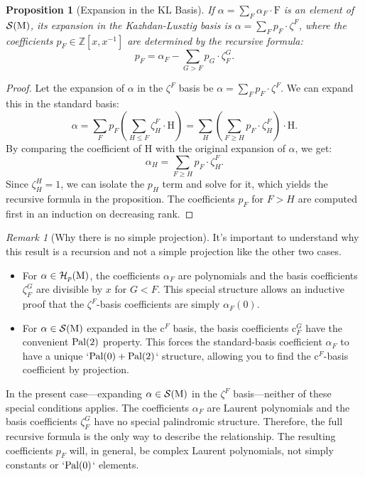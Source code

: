 \documentclass[11pt]{article}
\newcommand{\calH}{\mathcal{H}}
\newcommand{\calS}{\mathcal{S}}
\newcommand{\M}{\normalfont\text{M}}
\newcommand{\ZZ}{\mathbb{Z}}
\newcommand{\Ebasis}[1]{\mathrm{#1}}
\newcommand{\Cbasis}[1]{\mathrm{c}^{#1}}
\newcommand{\CbasisSub}[2]{\mathrm{c}^{#1}_{#2}}
\newcommand{\Zbasis}[1]{\zeta^{#1}}
\newcommand{\ZbasisSub}[2]{\zeta^{#1}_{#2}}
\newcommand{\pal}{\normalfont\text{Pal}}
\newtheorem{proposition}[theorem]{Proposition}
\theoremstyle{remark}
\newtheorem*{remark}{Remark} %
\begin{document}
\begin{proposition}[Expansion in the KL Basis]\label{prop:expansion_in_zbasis}
    If \(\alpha = \sum_F \alpha_F \cdot\Ebasis{F}\) is an element of \(\calS(\M)\), its expansion in the Kazhdan-Lusztig basis is \(\alpha = \sum_F p_F \cdot\Zbasis{F}\), where the coefficients \(p_F \in \ZZ[x, x^{-1}]\) are determined by the recursive formula:
    \[ p_F = \alpha_F - \sum_{G > F} p_G \cdot \ZbasisSub{G}{F}. \]
\end{proposition}
\begin{proof}
    Let the expansion of \(\alpha\) in the \(\Zbasis{F}\) basis be \(\alpha = \sum_F p_F \cdot\Zbasis{F}\). We can expand this in the standard basis:
    \[ \alpha = \sum_F p_F \left( \sum_{H \le F} \ZbasisSub{F}{H} \cdot \Ebasis{H} \right) = \sum_H \left( \sum_{F \ge H} p_F \cdot \ZbasisSub{F}{H} \right) \cdot \Ebasis{H}. \]
    By comparing the coefficient of \(\Ebasis{H}\) with the original expansion of \(\alpha\), we get:
    \[ \alpha_H = \sum_{F \ge H} p_F \cdot \ZbasisSub{F}{H}. \]
    Since \(\ZbasisSub{H}{H} = 1\), we can isolate the \(p_H\) term and solve for it, which yields the recursive formula in the proposition. The coefficients \(p_F\) for \(F > H\) are computed first in an induction on decreasing rank.
\end{proof}

\begin{remark}[Why there is no simple projection]
It's important to understand why this result is a recursion and not a simple projection like the other two cases.
\begin{itemize}
    \item For \(\alpha \in \calH_p(\M)\), the coefficients \(\alpha_F\) are polynomials and the basis coefficients \(\ZbasisSub{G}{F}\) are divisible by \(x\) for \(G<F\). This special structure allows an inductive proof that the \(\Zbasis{F}\)-basis coefficients are simply \(\alpha_F(0)\).
    \item For \(\alpha \in \calS(\M)\) expanded in the \(\Cbasis{F}\) basis, the basis coefficients \(\CbasisSub{G}{F}\) have the convenient \(\pal(2)\) property. This forces the standard-basis coefficient \(\alpha_F\) to have a unique `\(\pal(0)+\pal(2)\)` structure, allowing you to find the \(\Cbasis{F}\)-basis coefficient by projection.
\end{itemize}
In the present case—expanding \(\alpha \in \calS(\M)\) in the \(\Zbasis{F}\) basis—neither of these special conditions applies. The coefficients \(\alpha_F\) are Laurent polynomials and the basis coefficients \(\ZbasisSub{G}{F}\) have no special palindromic structure. Therefore, the full recursive formula is the only way to describe the relationship. The resulting coefficients \(p_F\) will, in general, be complex Laurent polynomials, not simply constants or `\(\pal(0)\)` elements.
\end{remark}
\end{document}
